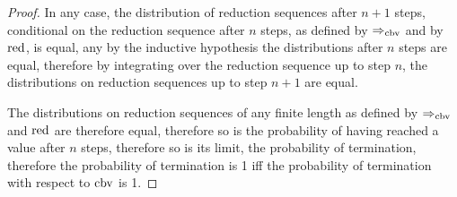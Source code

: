 \begin{proof}
In any case, the distribution of reduction sequences after $n+1$ steps, conditional on the reduction sequence after $n$ steps, as defined by $\Rightarrow_{\operatorname{cbv}}$ and by $\operatorname{red}$, is equal, any by the inductive hypothesis the distributions after $n$ steps are equal, therefore by integrating over the reduction sequence up to step $n$, the distributions on reduction sequences up to step $n+1$ are equal.

The distributions on reduction sequences of any finite length as defined by $\Rightarrow_{\operatorname{cbv}}$ and $\operatorname{red}$ are therefore equal, therefore so is the probability of having reached a value after $n$ steps, therefore so is its limit, the probability of termination, therefore the probability of termination is 1 iff the probability of termination with respect to $\operatorname{cbv}$ is 1.
\end{proof}

